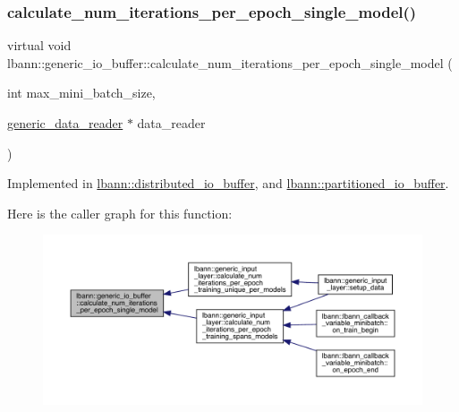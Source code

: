 \subsubsection{\texorpdfstring{calculate\+\_\+num\+\_\+iterations\+\_\+per\+\_\+epoch\+\_\+single\+\_\+model()}{calculate\_num\_iterations\_per\_epoch\_single\_model()}}
{\footnotesize\ttfamily virtual void lbann\+::generic\+\_\+io\+\_\+buffer\+::calculate\+\_\+num\+\_\+iterations\+\_\+per\+\_\+epoch\+\_\+single\+\_\+model (\begin{DoxyParamCaption}\item[{int}]{max\+\_\+mini\+\_\+batch\+\_\+size,  }\item[{\hyperlink{classlbann_1_1generic__data__reader}{generic\+\_\+data\+\_\+reader} $\ast$}]{data\+\_\+reader }\end{DoxyParamCaption})\hspace{0.3cm}{\ttfamily [pure virtual]}}



Implemented in \hyperlink{classlbann_1_1distributed__io__buffer_a2a611c36620155646e46e065e040541f}{lbann\+::distributed\+\_\+io\+\_\+buffer}, and \hyperlink{classlbann_1_1partitioned__io__buffer_ad707e54827d6e537127341b10407b716}{lbann\+::partitioned\+\_\+io\+\_\+buffer}.

Here is the caller graph for this function\+:\nopagebreak
\begin{figure}[H]
\begin{center}
\leavevmode
\includegraphics[width=350pt]{classlbann_1_1generic__io__buffer_a4c71135fada7f0da0b315d538d327e59_icgraph}
\end{center}
\end{figure}
\mbox{\label{classlbann_1_1generic__io__buffer_ac943184cf364f7922648e3acb760b41e}} 
